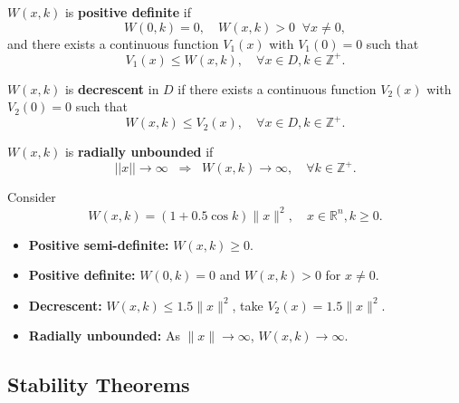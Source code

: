 \begin{definition}
$W(x,k)$ is \textbf{positive definite} if
\begin{equation}
W(0,k) = 0, \quad W(x,k) > 0 \;\; \forall x \neq 0,
\end{equation}
and there exists a continuous function $V_1(x)$ with $V_1(0)=0$ such that
\begin{equation}
V_1(x) \leq W(x,k), \quad \forall x \in D, k \in \mathbb{Z}^+.
\end{equation}
\end{definition}

\begin{definition}
$W(x,k)$ is \textbf{decrescent} in $D$ if there exists a continuous function $V_2(x)$ with $V_2(0)=0$ such that
\begin{equation}
W(x,k) \leq V_2(x), \quad \forall x \in D, k \in \mathbb{Z}^+.
\end{equation}
\end{definition}

\begin{definition}
$W(x,k)$ is \textbf{radially unbounded} if
\begin{equation}
||x|| \to \infty \;\; \Rightarrow \;\; W(x,k) \to \infty, \quad \forall k \in \mathbb{Z}^+.
\end{equation}
\end{definition}

\begin{example}
Consider
\begin{equation}
W(x,k) = (1+0.5\cos k)\|x\|^2, \quad x\in\mathbb{R}^n, k \ge 0.
\end{equation}

\begin{itemize}
    \item \textbf{Positive semi-definite:} $W(x,k) \ge 0$.  
    \item \textbf{Positive definite:} $W(0,k) = 0$ and $W(x,k) > 0$ for $x \neq 0$.  
    \item \textbf{Decrescent:} $W(x,k) \le 1.5\|x\|^2$, take $V_2(x)=1.5\|x\|^2$.  
    \item \textbf{Radially unbounded:} As $\|x\|\to \infty$, $W(x,k)\to\infty$.  
\end{itemize}
\end{example}

\subsection{Stability Theorems}

